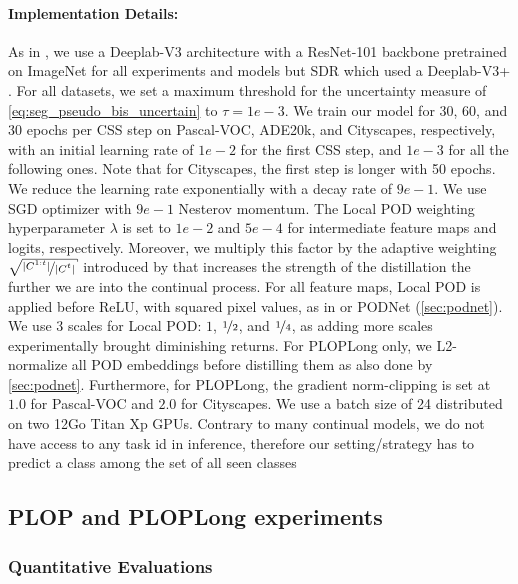 \paragraph{Implementation Details:} As in \citet{cermelli2020modelingthebackground}, we use a
Deeplab-V3 \citep{chen2017deeplabv3} architecture with a ResNet-101 \citep{he2016resnet} backbone
pretrained on ImageNet \citep{deng2009imagenet} for all experiments and models but SDR
\citep{michieli2021sdr} which used a Deeplab-V3+ \citep{chen2018deeplabv3plus}. For all datasets, we
set a maximum threshold for the uncertainty measure of \autoref{eq:seg_pseudo_bis_uncertain} to
$\tau=1e-3$. We train our model for 30, 60, and 30 epochs per \ac{CSS} step on Pascal-VOC, ADE20k,
and Cityscapes, respectively, with an initial learning rate of $1e-2$ for the first \ac{CSS} step,
and $1e-3$ for all the following ones. Note that for Cityscapes, the first step is longer with 50
epochs. We reduce the learning rate exponentially with a decay rate of $9e-1$. We use SGD optimizer
with $9e-1$ Nesterov momentum. The Local POD weighting hyperparameter $\lambda$ is set to $1e-2$ and
$5e-4$ for intermediate feature maps and logits, respectively. Moreover, we multiply this factor by
the adaptive weighting $\sqrt{\nicefrac{|C^{1:t}|}{|C^{t}|}}$ introduced by \citet{hou2019ucir} that
increases the strength of the distillation the further we are into the continual process. For all
feature maps, Local POD is applied before ReLU, with squared pixel values, as in
\citet{zagoruyko2016distillation_attention} or PODNet (\autoref{sec:podnet}). We use 3 scales for
Local POD: $1$, $\nicefrac{1}{2}$, and $\nicefrac{1}{4}$, as adding more scales experimentally
brought diminishing returns. For PLOPLong only, we L2-normalize all POD embeddings before distilling
them as also done by \autoref{sec:podnet}. Furthermore, for PLOPLong, the gradient norm-clipping is
set at $1.0$ for Pascal-VOC and $2.0$ for Cityscapes. We use a batch size of 24 distributed on two
12Go Titan Xp GPUs. Contrary to many continual models, we do not have access to any task id in
inference, therefore our setting/strategy has to predict a class among the set of all seen classes



\subsection{PLOP and PLOPLong experiments}
\label{sec:seg_plop_exp}

\subsubsection{Quantitative Evaluations}


